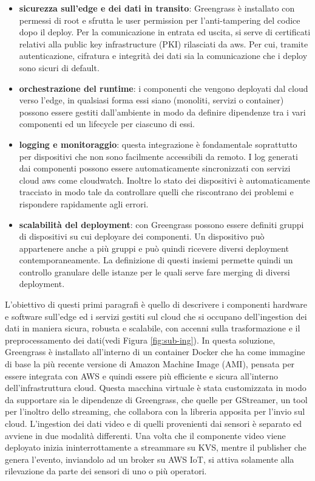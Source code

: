 \begin{itemize}
	\item \textbf{sicurezza sull’edge e dei dati in transito}: Greengrass è installato con permessi di root e sfrutta le user permission per l’anti-tampering del codice dopo il deploy. Per la comunicazione in entrata ed uscita, si serve di certificati relativi alla public key infrastructure (PKI) rilasciati da aws. Per cui, tramite autenticazione, cifratura e integrità dei dati sia la comunicazione che i deploy sono sicuri di default.
	\item \textbf{orchestrazione del runtime}: i componenti che vengono deployati dal cloud verso l’edge, in qualsiasi forma essi siano (monoliti, servizi o container) possono essere gestiti dall’ambiente in modo da definire dipendenze tra i vari componenti ed un lifecycle per ciascuno di essi.  
	\item \textbf{logging e monitoraggio}: questa integrazione è fondamentale soprattutto per dispositivi che non sono facilmente accessibili da remoto. I log generati dai componenti possono essere automaticamente sincronizzati con servizi cloud aws come cloudwatch. Inoltre lo stato dei dispositivi è automaticamente tracciato in modo tale da controllare quelli che riscontrano dei problemi e rispondere rapidamente agli errori.
	\item \textbf{scalabilità del deployment}: con Greengrass possono essere definiti gruppi di dispositivi su cui deployare dei componenti. Un dispositivo può appartenere anche a più gruppi e può quindi ricevere diversi deployment contemporaneamente. La definizione di questi insiemi permette quindi un controllo granulare delle istanze per le quali serve fare merging di diversi deployment.
\end{itemize}

L'obiettivo di questi primi paragrafi è quello di descrivere i componenti hardware e software sull’edge ed i servizi gestiti sul cloud che si occupano dell’ingestion dei dati in maniera sicura, robusta e scalabile, con accenni sulla trasformazione e il preprocessamento dei dati(vedi Figura \ref{fig:sub-ing}). In questa soluzione, Greengrass è installato all’interno di un container Docker che ha come immagine di base la più recente versione di Amazon Machine Image (AMI), pensata per essere integrata con AWS e quindi essere più efficiente e sicura all’interno dell’infrastruttura cloud. Questa macchina virtuale è stata customizzata in modo da supportare sia le dipendenze di Greengrass, che quelle per GStreamer, un tool per l’inoltro dello streaming, che collabora con la libreria apposita per l'invio sul cloud. L’ingestion dei dati video e di quelli provenienti dai sensori è separato ed avviene in due modalità differenti. Una volta che il componente video viene deployato inizia ininterrottamente a streammare su KVS, mentre il publisher che genera l’evento, inviandolo ad un broker su AWS IoT, si attiva solamente alla rilevazione da parte dei sensori di uno o più operatori. 

